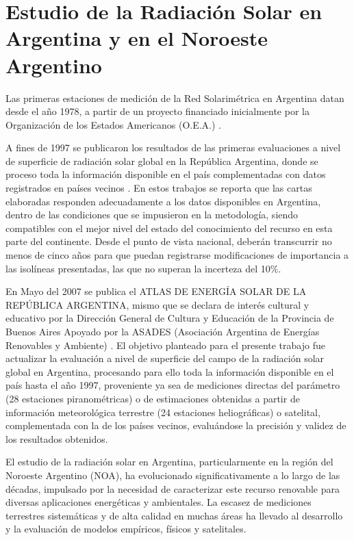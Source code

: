 \section{Estudio de la Radiación Solar en Argentina y en el Noroeste Argentino}

Las primeras estaciones de medición de la Red Solarimétrica en Argentina datan desde el año 1978, a partir de un proyecto financiado inicialmente por la Organización de los Estados Americanos (O.E.A.) \cite{GrossiGallegos1999}.

A fines de 1997 se publicaron los resultados de las primeras evaluaciones a nivel de superficie de radiación solar global en la República Argentina, donde se proceso toda la información disponible en el país complementadas con datos registrados en países vecinos \cite{GrossiGallegos1998A, GrossiGallegos1998B}. En estos trabajos se reporta que  las cartas elaboradas responden adecuadamente a los datos  disponibles en Argentina, dentro de las condiciones que se impusieron en la metodología, siendo compatibles con el mejor nivel del estado del conocimiento del recurso en esta parte del continente.
Desde el punto de vista nacional, deberán transcurrir no menos de cinco años para que puedan registrarse modificaciones de
importancia a las isolíneas presentadas, las que no superan la incerteza del 10\%.


En Mayo del 2007 se publica el ATLAS DE ENERGÍA SOLAR DE LA REPÚBLICA ARGENTINA, mismo que se declara de interés cultural y educativo por la Dirección General
de Cultura y Educación de la Provincia de Buenos Aires Apoyado por la ASADES (Asociación Argentina de Energías Renovables y Ambiente) \citet{GrossiRighini2007}. El objetivo planteado para el presente trabajo fue actualizar la evaluación a nivel de superficie del campo de la radiación solar global en Argentina, procesando para ello toda la información disponible en el país hasta el año 1997, proveniente ya sea de mediciones directas del parámetro (28 estaciones piranométricas) o de estimaciones obtenidas a partir de información meteorológica terrestre (24 estaciones heliográficas) o satelital, complementada con la de los países vecinos, evaluándose la precisión y validez de los resultados obtenidos.



El estudio de la radiación solar en Argentina, particularmente en la región del Noroeste Argentino (NOA), ha evolucionado significativamente a lo largo de las décadas, impulsado por la necesidad de caracterizar este recurso renovable para diversas aplicaciones energéticas y ambientales. La escasez de mediciones terrestres sistemáticas y de alta calidad en muchas áreas ha llevado al desarrollo y la evaluación de modelos empíricos, físicos y satelitales.\\

